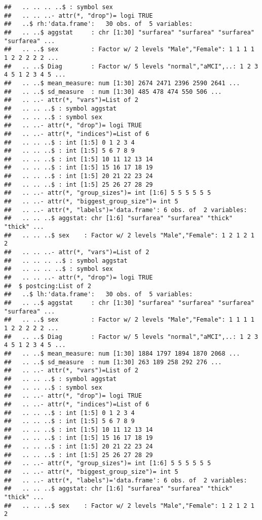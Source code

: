 \documentclass[12pt]{article}\usepackage[]{graphicx}\usepackage[]{color}
\makeatletter
\newenvironment{kframe}{%
 \def\at@end@of@kframe{}%
 \ifinner\ifhmode%
  \def\at@end@of@kframe{\end{minipage}}%
  \begin{minipage}{\columnwidth}%
 \fi\fi%
 \def\FrameCommand##1{\hskip\@totalleftmargin \hskip-\fboxsep
 \colorbox{shadecolor}{##1}\hskip-\fboxsep
     \hskip-\linewidth \hskip-\@totalleftmargin \hskip\columnwidth}%
 \MakeFramed {\advance\hsize-\width
   \@totalleftmargin\z@ \linewidth\hsize
   \@setminipage}}%
 {\par\unskip\endMakeFramed%
 \at@end@of@kframe}
\newenvironment{knitrout}{}{} %
\makeatother
\begin{document}
\begin{knitrout}
\begin{kframe}
\begin{verbatim}
##   .. .. .. ..$ : symbol sex
##   .. .. ..- attr(*, "drop")= logi TRUE
##   ..$ rh:'data.frame':	30 obs. of  5 variables:
##   .. ..$ aggstat     : chr [1:30] "surfarea" "surfarea" "surfarea" "surfarea" ...
##   .. ..$ sex         : Factor w/ 2 levels "Male","Female": 1 1 1 1 1 2 2 2 2 2 ...
##   .. ..$ Diag        : Factor w/ 5 levels "normal","aMCI",..: 1 2 3 4 5 1 2 3 4 5 ...
##   .. ..$ mean_measure: num [1:30] 2674 2471 2396 2590 2641 ...
##   .. ..$ sd_measure  : num [1:30] 485 478 474 550 506 ...
##   .. ..- attr(*, "vars")=List of 2
##   .. .. ..$ : symbol aggstat
##   .. .. ..$ : symbol sex
##   .. ..- attr(*, "drop")= logi TRUE
##   .. ..- attr(*, "indices")=List of 6
##   .. .. ..$ : int [1:5] 0 1 2 3 4
##   .. .. ..$ : int [1:5] 5 6 7 8 9
##   .. .. ..$ : int [1:5] 10 11 12 13 14
##   .. .. ..$ : int [1:5] 15 16 17 18 19
##   .. .. ..$ : int [1:5] 20 21 22 23 24
##   .. .. ..$ : int [1:5] 25 26 27 28 29
##   .. ..- attr(*, "group_sizes")= int [1:6] 5 5 5 5 5 5
##   .. ..- attr(*, "biggest_group_size")= int 5
##   .. ..- attr(*, "labels")='data.frame':	6 obs. of  2 variables:
##   .. .. ..$ aggstat: chr [1:6] "surfarea" "surfarea" "thick" "thick" ...
##   .. .. ..$ sex    : Factor w/ 2 levels "Male","Female": 1 2 1 2 1 2
##   .. .. ..- attr(*, "vars")=List of 2
##   .. .. .. ..$ : symbol aggstat
##   .. .. .. ..$ : symbol sex
##   .. .. ..- attr(*, "drop")= logi TRUE
##  $ postcing:List of 2
##   ..$ lh:'data.frame':	30 obs. of  5 variables:
##   .. ..$ aggstat     : chr [1:30] "surfarea" "surfarea" "surfarea" "surfarea" ...
##   .. ..$ sex         : Factor w/ 2 levels "Male","Female": 1 1 1 1 1 2 2 2 2 2 ...
##   .. ..$ Diag        : Factor w/ 5 levels "normal","aMCI",..: 1 2 3 4 5 1 2 3 4 5 ...
##   .. ..$ mean_measure: num [1:30] 1884 1797 1894 1870 2068 ...
##   .. ..$ sd_measure  : num [1:30] 263 189 258 292 276 ...
##   .. ..- attr(*, "vars")=List of 2
##   .. .. ..$ : symbol aggstat
##   .. .. ..$ : symbol sex
##   .. ..- attr(*, "drop")= logi TRUE
##   .. ..- attr(*, "indices")=List of 6
##   .. .. ..$ : int [1:5] 0 1 2 3 4
##   .. .. ..$ : int [1:5] 5 6 7 8 9
##   .. .. ..$ : int [1:5] 10 11 12 13 14
##   .. .. ..$ : int [1:5] 15 16 17 18 19
##   .. .. ..$ : int [1:5] 20 21 22 23 24
##   .. .. ..$ : int [1:5] 25 26 27 28 29
##   .. ..- attr(*, "group_sizes")= int [1:6] 5 5 5 5 5 5
##   .. ..- attr(*, "biggest_group_size")= int 5
##   .. ..- attr(*, "labels")='data.frame':	6 obs. of  2 variables:
##   .. .. ..$ aggstat: chr [1:6] "surfarea" "surfarea" "thick" "thick" ...
##   .. .. ..$ sex    : Factor w/ 2 levels "Male","Female": 1 2 1 2 1 2

\end{verbatim}
\end{kframe}
\end{knitrout}
\end{document}

